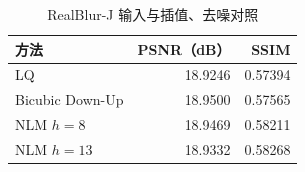 \begin{table}[htbp]
\centering
\caption{RealBlur-J 输入与插值、去噪对照}
\label{tab:rb-controls}
\begin{tabular}{lrr}
\toprule
方法 & PSNR（dB） & SSIM \\
\midrule
LQ & 18.9246 & 0.57394 \\
Bicubic Down-Up & 18.9500 & 0.57565 \\
NLM $h=8$ & 18.9469 & 0.58211 \\
NLM $h=13$ & 18.9332 & 0.58268 \\
\bottomrule
\end{tabular}
\end{table}
